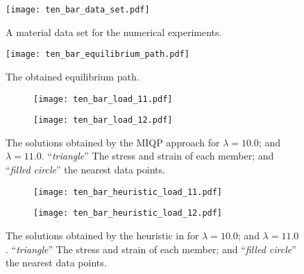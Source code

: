 \documentclass[a4paper,11pt]{scrartcl}
\theoremstyle{plain}
\theoremstyle{definition}
\theoremstyle{remark}
\begin{document}
\begin{figure}[tp]
\centering
  \texttt{[image: ten\_bar\_data\_set.pdf]}
  \caption{A material data set for the numerical experiments. }
  \label{fig:ten_bar_data_set}
\end{figure}

\begin{figure}[tp]
\centering
  \texttt{[image: ten\_bar\_equilibrium\_path.pdf]}
  \caption{The obtained equilibrium path. }
  \label{fig:ten_bar_equilibrium_path}
\end{figure}

\begin{figure}[tp]
\centering
  \begin{subfigure}[b]{0.47\textwidth}
    \centering
    \texttt{[image: ten\_bar\_load\_11.pdf]}
    \caption{}
    \label{fig:ten_bar_load_11}
  \end{subfigure}
  \hfill
  \begin{subfigure}[b]{0.47\textwidth}
    \centering
    \texttt{[image: ten\_bar\_load\_12.pdf]}
    \caption{}
    \label{fig:ten_bar_load_12}
  \end{subfigure}
  \caption{The solutions obtained by the MIQP approach for 
   $\lambda=10.0$; and 
   $\lambda=11.0$. 
  ``{\em triangle\/}'' The stress and strain of each member; and 
  ``{\em filled circle\/}'' the nearest data points. 
  }
  \label{fig:ten_bar_load}
\par\bigskip
\centering
  \begin{subfigure}[b]{0.47\textwidth}
    \centering
    \texttt{[image: ten\_bar\_heuristic\_load\_11.pdf]}
    \caption{}
    \label{fig:ten_bar_heuristic_load_11}
  \end{subfigure}
  \hfill
  \begin{subfigure}[b]{0.47\textwidth}
    \centering
    \texttt{[image: ten\_bar\_heuristic\_load\_12.pdf]}
    \caption{}
    \label{fig:ten_bar_heuristic_load_12}
  \end{subfigure}
  \caption{The solutions obtained by the heuristic in \cite{KO16} for 
   $\lambda=10.0$; and 
   $\lambda=11.0$. 
  ``{\em triangle\/}'' The stress and strain of each member; and 
  ``{\em filled circle\/}'' the nearest data points. 
  }
  \label{fig:ten_bar_heuristic_load}
\end{figure}
\end{document}
